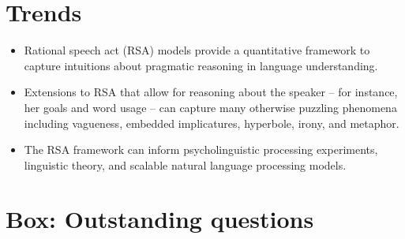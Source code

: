 \documentclass[]{elsarticle}
\begin{document}




\section{Trends}\label{trends-box}

\begin{itemize}
\item Rational speech act (RSA) models provide a quantitative framework to
  capture intuitions about pragmatic reasoning in language
  understanding.
\item Extensions to RSA that allow for reasoning about the speaker -- for instance, her goals and word usage -- can capture many otherwise puzzling phenomena
  including vagueness, embedded implicatures, hyperbole, irony, and
  metaphor.
\item The RSA framework can inform psycholinguistic processing experiments,
  linguistic theory, and scalable natural language processing models.
\end{itemize}

\section{Box: Outstanding questions}\label{box-outstanding-questions}
\end{document}
